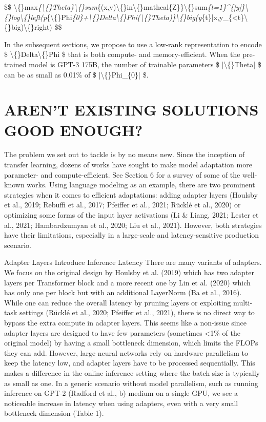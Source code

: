 \documentclass[conference]{IEEEtran}
\begin{document}
\$\$ \textbackslash\{\}max\textit{\{\textbackslash\{\}Theta\}\textbackslash\{\}sum}\{(x,y)\textbackslash\{\}in\textbackslash\{\}mathcal\{Z\}\}\textbackslash\{\}sum\textit{\{t=1\}\textasciicircum{}\{|y|\}\textbackslash\{\}log\textbackslash\{\}left(p}\{\textbackslash\{\}Phi\textit{\{0\}+\textbackslash\{\}Delta\textbackslash\{\}Phi(\textbackslash\{\}Theta)\}\textbackslash\{\}big(y}\{t\}|x,y\_\{\textless{}t\}\textbackslash\{\}big)\textbackslash\{\}right) \$\$

In the subsequent sections, we propose to use a low-rank representation to encode  \$ \textbackslash\{\}Delta\textbackslash\{\}Phi \$ that is both compute- and memory-efficient. When the pre-trained model is GPT-3 175B, the number of trainable parameters  \$ |\textbackslash\{\}Theta| \$ can be as small as 0.01\% of  \$ |\textbackslash\{\}Phi\_\{0\}| \$.




\section{AREN'T EXISTING SOLUTIONS GOOD ENOUGH?}

The problem we set out to tackle is by no means new. Since the inception of transfer learning, dozens of works have sought to make model adaptation more parameter- and compute-efficient. See Section 6 for a survey of some of the well-known works. Using language modeling as an example, there are two prominent strategies when it comes to efficient adaptations: adding adapter layers (Houlsby et al., 2019; Rebuffi et al., 2017; Pfeiffer et al., 2021; Rücklé et al., 2020) or optimizing some forms of the input layer activations (Li \& Liang, 2021; Lester et al., 2021; Hambardzumyan et al., 2020; Liu et al., 2021). However, both strategies have their limitations, especially in a large-scale and latency-sensitive production scenario.

Adapter Layers Introduce Inference Latency There are many variants of adapters. We focus on the original design by Houlsby et al. (2019) which has two adapter layers per Transformer block and a more recent one by Lin et al. (2020) which has only one per block but with an additional LayerNorm (Ba et al., 2016). While one can reduce the overall latency by pruning layers or exploiting multi-task settings (Rücklé et al., 2020; Pfeiffer et al., 2021), there is no direct way to bypass the extra compute in adapter layers. This seems like a non-issue since adapter layers are designed to have few parameters (sometimes \textless{}1\% of the original model) by having a small bottleneck dimension, which limits the FLOPs they can add. However, large neural networks rely on hardware parallelism to keep the latency low, and adapter layers have to be processed sequentially. This makes a difference in the online inference setting where the batch size is typically as small as one. In a generic scenario without model parallelism, such as running inference on GPT-2 (Radford et al., b) medium on a single GPU, we see a noticeable increase in latency when using adapters, even with a very small bottleneck dimension (Table 1).
\end{document}
